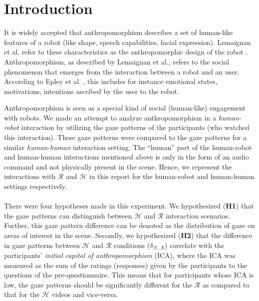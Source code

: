 \documentclass{acm_proc_article-sp}
\begin{document}

\section{Introduction}

It is widely accepted that anthropomorphism describes a set of human-like
features of a robot (like shape, speech capabilities, facial expression).
Lemaignan et al. \cite{mc5}  refer to these characteristics as the
anthropomorphic design of the robot .  Anthropomorphism, as described by
Lemaignan et al., refers to the social phenomenon that emerges from the
interaction between a robot and an user. According to Epley et al. \cite{mc4},
this includes for instance emotional states, motivations, intentions ascribed by
the user to the robot. 

Anthropomorphism is seen as a special kind of social (human-like) engagement
with robots. We made an attempt to analyze anthropomorphism in a
\textit{human-robot} interaction by utilizing the gaze patterns of the
participants (who watched this interaction). These gaze patterns were compared
to the gaze patterns for a similar \textit{human-human} interaction setting. The
``human'' part of the human-robot and human-human interactions mentioned above
is only in the form of an audio command and not physically present in the scene.
Hence, we represent the interactions with $\mathcal{R}$ and $\mathcal{H}$ in
this report for the human-robot and human-human settings respectively.\\ \\
There were four hypotheses made in this experiment. We hypothesized
(\textbf{H1}) that the gaze patterns can distinguish between $\mathcal{H}$ and
$\mathcal{R}$ interaction scenarios. Further, this gaze pattern difference can
be denoted as the distribution of gaze on areas of interest in the scene.
Secondly, we hypothesized (\textbf{H2}) that the difference in gaze patterns
between $\mathcal{H}$ and $\mathcal{R}$ conditions
($\delta_{\mathcal{H},\mathcal{R}}$) correlate with the participants'
\textit{initial capital of anthropomorphism} (ICA), where the ICA was measured
as the sum of the ratings (responses) given by the participants to the questions
of the pre-questionnaire. This means that for participants whose ICA is low, the
gaze patterns should be significantly different for the $\mathcal{R}$ as
compared to that for the $\mathcal{H}$ videos and vice-versa.
\end{document}
